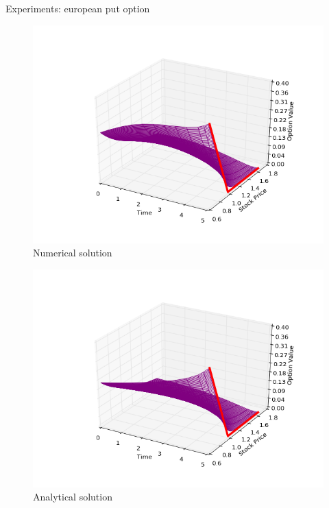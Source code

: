 \documentclass{beamer}
\theoremstyle{definition}
\theoremstyle{plain}
\theoremstyle{remark}
\begin{document}
		\begin{frame}{Experiments: european put option}
			\begin{minipage}{\linewidth}
      \centering
      \begin{minipage}{0.45\linewidth}
          \begin{figure}[H]
              \includegraphics[width=\linewidth]{Figures/eu-put}
              \caption{Numerical solution}
          \end{figure}
      \end{minipage}
      \hspace{0.05\linewidth}
      \begin{minipage}{0.45\linewidth}
          \begin{figure}[H]
              \includegraphics[width=\linewidth]{Figures/eu-put-analyt}
              \caption{Analytical solution}
          \end{figure}
      \end{minipage}
  \end{minipage}
 	\end{frame}
\end{document}
